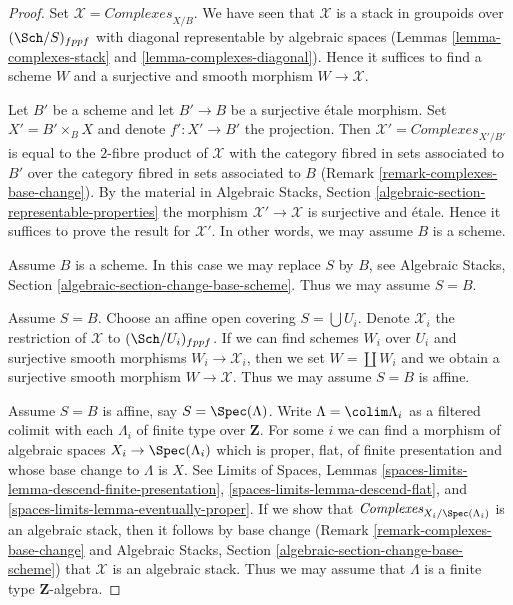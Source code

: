 \begin{proof}
Set $\mathcal{X} = \textit{Complexes}_{X/B}$. We have seen that $\mathcal{X}$
is a stack in groupoids over $(\Sch/S)_{fppf}$ with diagonal representable
by algebraic spaces
(Lemmas \ref{lemma-complexes-stack} and \ref{lemma-complexes-diagonal}).
Hence it suffices to find a scheme $W$ and a surjective and smooth
morphism $W \to \mathcal{X}$.

\medskip\noindent
Let $B'$ be a scheme and let $B' \to B$ be a surjective \'etale morphism.
Set $X' = B' \times_B X$ and denote $f' : X' \to B'$ the projection.
Then $\mathcal{X}' = \textit{Complexes}_{X'/B'}$ is equal to the $2$-fibre
product of $\mathcal{X}$ with the category fibred in sets
associated to $B'$ over the category fibred in sets associated to $B$
(Remark \ref{remark-complexes-base-change}). By the material in
Algebraic Stacks, Section \ref{algebraic-section-representable-properties}
the morphism $\mathcal{X}' \to \mathcal{X}$ is surjective and \'etale.
Hence it suffices to prove the result for $\mathcal{X}'$.
In other words, we may assume $B$ is a scheme.

\medskip\noindent
Assume $B$ is a scheme. In this case we may replace $S$ by $B$, see
Algebraic Stacks, Section \ref{algebraic-section-change-base-scheme}.
Thus we may assume $S = B$.

\medskip\noindent
Assume $S = B$. Choose an affine open covering $S = \bigcup U_i$.
Denote $\mathcal{X}_i$ the restriction of $\mathcal{X}$ to
$(\Sch/U_i)_{fppf}$. If we can find schemes $W_i$ over $U_i$ and
surjective smooth morphisms $W_i \to \mathcal{X}_i$, then we
set $W = \coprod W_i$ and we obtain a surjective smooth morphism
$W \to \mathcal{X}$. Thus we may assume $S = B$ is affine.

\medskip\noindent
Assume $S = B$ is affine, say $S = \Spec(\Lambda)$.
Write $\Lambda = \colim \Lambda_i$ as a filtered colimit with each $\Lambda_i$
of finite type over $\mathbf{Z}$. For some $i$ we can find
a morphism of algebraic spaces $X_i \to \Spec(\Lambda_i)$
which is proper, flat, of finite presentation and whose base change
to $\Lambda$ is $X$. See Limits of Spaces, Lemmas
\ref{spaces-limits-lemma-descend-finite-presentation},
\ref{spaces-limits-lemma-descend-flat}, and
\ref{spaces-limits-lemma-eventually-proper}.
If we show that $\textit{Complexes}_{X_i/\Spec(\Lambda_i)}$ is an
algebraic stack, then it follows by base change
(Remark \ref{remark-complexes-base-change} and
Algebraic Stacks, Section \ref{algebraic-section-change-base-scheme})
that $\mathcal{X}$ is an algebraic stack.
Thus we may assume that $\Lambda$ is a finite type $\mathbf{Z}$-algebra.


\end{proof}
